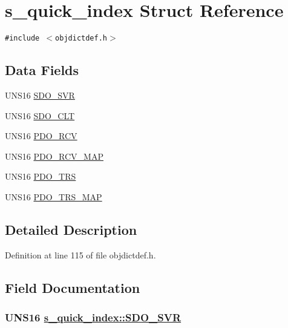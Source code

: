 \hypertarget{structs__quick__index}{
\section{s\_\-quick\_\-index Struct Reference}
\label{structs__quick__index}
}
{\tt \#include $<$objdictdef.h$>$}

\subsection*{Data Fields}
\begin{CompactItemize}
\item 
UNS16 \hyperlink{structs__quick__index_998dc7bd9cf744bf43510c1273a4a3c2}{SDO\_\-SVR}
\item 
UNS16 \hyperlink{structs__quick__index_6224504249d0fd33d8dd09d874c92ace}{SDO\_\-CLT}
\item 
UNS16 \hyperlink{structs__quick__index_cadbae6acd5ded4e8eebf0ce88c2ec55}{PDO\_\-RCV}
\item 
UNS16 \hyperlink{structs__quick__index_9a83f9efff533e71d580fda6118b101e}{PDO\_\-RCV\_\-MAP}
\item 
UNS16 \hyperlink{structs__quick__index_48e0ba31ff7746f1fa63f240a132a906}{PDO\_\-TRS}
\item 
UNS16 \hyperlink{structs__quick__index_c91a86195b3615a98f7b07e0c51ac75f}{PDO\_\-TRS\_\-MAP}
\end{CompactItemize}


\subsection{Detailed Description}




Definition at line 115 of file objdictdef.h.

\subsection{Field Documentation}
\hypertarget{structs__quick__index_998dc7bd9cf744bf43510c1273a4a3c2}{
\subsubsection[SDO\_\-SVR]{\setlength{\rightskip}{0pt plus 5cm}UNS16 \hyperlink{structs__quick__index_998dc7bd9cf744bf43510c1273a4a3c2}{s\_\-quick\_\-index::SDO\_\-SVR}}}
\label{structs__quick__index_998dc7bd9cf744bf43510c1273a4a3c2}





